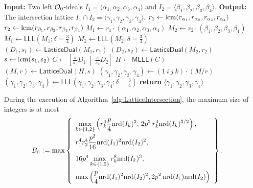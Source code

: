 \begin{algorithm}
\caption{CompactLatticeIntersection($I_1,I_2$)}
\label{alg:LatticeIntersection}
\begin{algorithmic}[1]
  \Statex \textbf{Input:} Two left $\mathcal{O}_0$-ideals
  $I_1=\langle \alpha_1,\alpha_2,\alpha_3,\alpha_4\rangle$ and
  $I_2=\langle \beta_1,\beta_2,\beta_3,\beta_4\rangle$.
  \Statex \textbf{Output:} The intersection lattice
  $I_1\cap I_2=\langle \gamma_1,\gamma_2,\gamma_3,\gamma_4\rangle$.
  \State $r_1 \gets \mathrm{lcm}(r_{\alpha_1},r_{\alpha_2},r_{\alpha_3},r_{\alpha_4})$
  \State $r_2 \gets \mathrm{lcm}(r_{\beta_1},r_{\beta_2},r_{\beta_3},r_{\beta_4})$
  \State $M_1 \gets r_1\cdot(\alpha_1,\alpha_2,\alpha_3,\alpha_4)$
  \State $M_2 \gets r_2\cdot(\beta_1,\beta_2,\beta_3,\beta_4)$
  \State $M_1 \gets \mathsf{LLL}(M_1;\delta=\frac34)$
  \State $M_2 \gets \mathsf{LLL}(M_2;\delta=\frac34)$
  \State $(D_1,s_1) \gets \mathsf{LatticeDual}(M_1,r_1)$ 
  \State $(D_2,s_2) \gets \mathsf{LatticeDual}(M_2,r_2)$
  \State $s \gets \mathrm{lcm}(s_1,s_2)$
  \State $C \gets
  \left[
    \frac{s}{s_1}D_1\ \middle|\ \frac{s}{s_2}D_2
  \right]$
  \State $H \gets \mathsf{MLLL}(C)$
    \Statex \hspace{\algorithmicindent} 
  \State $(M,r) \gets \mathsf{LatticeDual}(H,s)$
    \Statex \hspace{\algorithmicindent} 
  \State $(\gamma_1,\gamma_2,\gamma_3,\gamma_4)
    \gets (1\ i\ j\ k)\cdot (M/r)$
  \State $(\gamma_1,\gamma_2,\gamma_3,\gamma_4)
    \gets \mathsf{LLL}(\gamma_1,\gamma_2,\gamma_3,\gamma_4;\delta=\frac34)$
  \State \textbf{return} $\langle \gamma_1,\gamma_2,\gamma_3,\gamma_4\rangle$
\end{algorithmic}
\end{algorithm}

\begin{lemma}
\label{lem:latticeinter-bound}
During the execution of Algorithm~\ref{alg:LatticeIntersection}, the
maximum size of integers is at most
\[
  B_{\cap}
  :=
  \max\left\{
  \begin{array}{l}
    \displaystyle
    \max_{k\in\{1,2\}}
  \left(
    r_k^4\frac{p}{4}\mathrm{nrd}(I_k)^2,\,
    2p^2\,r_k^4\mathrm{nrd}(I_k)^{3/2}
  \right),\\[3mm]
    \displaystyle
    r_1^4r_2^4\frac{p^2}{16}
    \mathrm{nrd}(I_1)^2\mathrm{nrd}(I_2)^2,\\[4mm]
    \displaystyle
    16p^4\max_{k\in\{1,2\}} r_k^8\mathrm{nrd}(I_k)^3,\\[4mm]
    \displaystyle
    \max\left(
    \frac{p}{4}\mathrm{nrd}(I_1)^2\mathrm{nrd}(I_2)^2,
    2p^2\,\mathrm{nrd}(I_1)\mathrm{nrd}(I_2)
    \right)
  \end{array}
  \right\}.
\]
\end{lemma}

